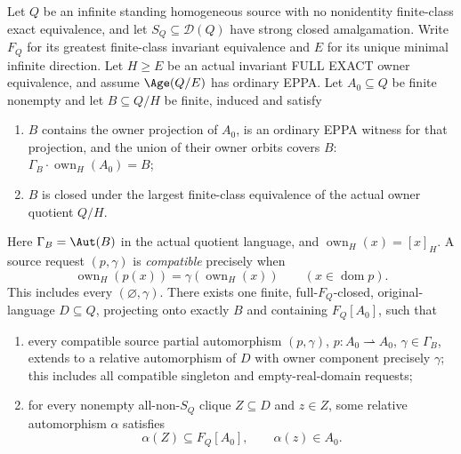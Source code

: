 \begin{lemma}
\label{lem:acf-relative-mi-normal}
Let \(Q\) be an infinite standing homogeneous source with no
nonidentity finite-class exact equivalence, and let
\(S_Q\subseteq\mathcal D(Q)\) have strong closed amalgamation.
Write \(F_Q\) for its greatest finite-class invariant equivalence
and \(E\) for its unique minimal infinite direction. Let
\(H\ge E\) be an actual invariant FULL EXACT owner equivalence,
and assume \(\Age(Q/E)\) has ordinary EPPA.
Let \(A_0\subseteq Q\) be finite
nonempty and let \(B\subseteq Q/H\) be finite, induced and
satisfy
\begin{enumerate}
\item \(B\) contains the owner projection of \(A_0\),
  is an ordinary EPPA witness for that projection,
  and the union of their owner orbits covers \(B\):
  \(\Gamma_B\cdot\operatorname{own}_H(A_0)=B\);
\item \(B\) is closed under the largest finite-class
  equivalence of the actual owner quotient \(Q/H\).
\end{enumerate}
Here \(\Gamma_B=\Aut(B)\) in the actual quotient language, and
\(\operatorname{own}_H(x)=[x]_H\). A source request \((p,\gamma)\)
is \emph{compatible} precisely when
\[
 \operatorname{own}_H(p(x))=\gamma(\operatorname{own}_H(x))
 \qquad(x\in\operatorname{dom}p).
\]
This includes every \((\varnothing,\gamma)\).
There exists one finite, full-\(F_Q\)-closed, original-language
\(D\subseteq Q\), projecting onto exactly \(B\) and
containing \(F_Q[A_0]\), such that
\begin{enumerate}
\item every compatible source partial automorphism
  \((p,\gamma)\), \(p:A_0\rightharpoonup A_0\),
  \(\gamma\in\Gamma_B\), extends to a relative
  automorphism of \(D\) with owner component precisely
  \(\gamma\); this includes all compatible singleton
  and empty-real-domain requests;
\item for every nonempty all-non-\(S_Q\) clique
  \(Z\subseteq D\) and \(z\in Z\), some relative
  automorphism \(\alpha\) satisfies
  \[
       \alpha(Z)\subseteq F_Q[A_0],
                   \qquad \alpha(z)\in A_0.
  \]
\end{enumerate}
\end{lemma}
